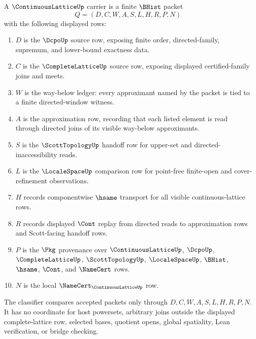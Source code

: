 \begin{definition}
\label{def:continuous-lattice-carrier}
A $\ContinuousLatticeUp$ carrier is a finite $\BHist$ packet
$$
Q=(D,C,W,A,S,L,H,R,P,N)
$$
with the following displayed rows:
\begin{enumerate}
\item $D$ is the $\DcpoUp$ source row, exposing finite order, directed-family, supremum, and lower-bound exactness data.
\item $C$ is the $\CompleteLatticeUp$ source row, exposing displayed certified-family joins and meets.
\item $W$ is the way-below ledger: every approximant named by the packet is tied to a finite directed-window witness.
\item $A$ is the approximation row, recording that each listed element is read through directed joins of its visible way-below approximants.
\item $S$ is the $\ScottTopologyUp$ handoff row for upper-set and directed-inaccessibility reads.
\item $L$ is the $\LocaleSpaceUp$ comparison row for point-free finite-open and cover-refinement observations.
\item $H$ records componentwise $\hsame$ transport for all visible continuous-lattice rows.
\item $R$ records displayed $\Cont$ replay from directed reads to approximation rows and Scott-facing handoff rows.
\item $P$ is the $\Pkg$ provenance over $\ContinuousLatticeUp$, $\DcpoUp$, $\CompleteLatticeUp$, $\ScottTopologyUp$, $\LocaleSpaceUp$, $\BHist$, $\hsame$, $\Cont$, and $\NameCert$ rows.
\item $N$ is the local $\NameCert_{\ContinuousLatticeUp}$ row.
\end{enumerate}
The classifier compares accepted packets only through $D,C,W,A,S,L,H,R,P,N$. It has no coordinate for host powersets, arbitrary joins outside the displayed complete-lattice row, selected bases, quotient opens, global spatiality, Lean verification, or bridge checking.
\end{definition}

